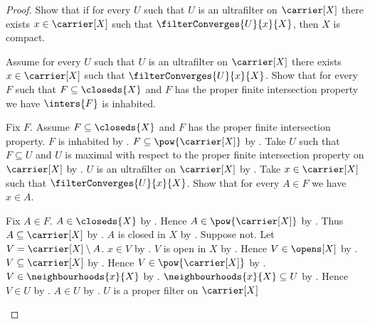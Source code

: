\begin{proof}
    Show that if for every $U$ such that
        $U$ is an ultrafilter on $\carrier[X]$ there exists
        $x\in\carrier[X]$ such that $\filterConverges{U}{x}{X}$,
        then $X$ is compact.
    \begin{subproof}
        Assume for every $U$ such that
            $U$ is an ultrafilter on $\carrier[X]$ there exists
            $x\in\carrier[X]$ such that $\filterConverges{U}{x}{X}$.
        Show that for every $F$ such that $F\subseteq\closeds{X}$ and
            $F$ has the proper finite intersection property we have
            $\inters{F}$ is inhabited.
        \begin{subproof}
            Fix $F$.
            Assume $F\subseteq\closeds{X}$ and
                $F$ has the proper finite intersection property.
            $F$ is inhabited by .
            $F\subseteq\pow{\carrier[X]}$
                by .
            Take $U$ such that $F\subseteq U$ and
                $U$ is maximal with respect to the proper finite intersection
                    property on $\carrier[X]$
                by .
            $U$ is an ultrafilter on $\carrier[X]$
                by .
            Take $x\in\carrier[X]$ such that
                $\filterConverges{U}{x}{X}$.
            Show that for every $A\in F$ we have $x\in A$.
            \begin{subproof}
                Fix $A\in F$.
                $A\in\closeds{X}$ by .
                Hence $A\in\pow{\carrier[X]}$ by .
                Thus $A\subseteq\carrier[X]$
                    by .
                $A$ is closed in $X$ by .
                Suppose not.
                Let $V=\carrier[X]\setminus A$.
                $x\in V$ by .
                $V$ is open in $X$
                    by .
                Hence $V\in\opens[X]$ by .
                $V\subseteq\carrier[X]$ by .
                Hence $V\in\pow{\carrier[X]}$
                    by .
                $V\in\neighbourhoods{x}{X}$
                    by .
                $\neighbourhoods{x}{X}\subseteq U$
                    by .
                Hence $V\in U$ by .
                $A\in U$ by .
                $U$ is a proper filter on $\carrier[X]$

\end{subproof}
\end{subproof}
\end{subproof}
\end{proof}
